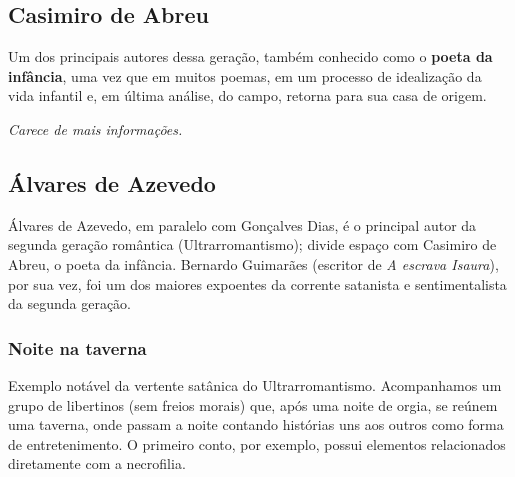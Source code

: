 \documentclass[12pt]{book}
\begin{document}
				\subsection{Casimiro de Abreu}
				\par Um dos principais autores dessa geração, também conhecido como o \textbf{poeta da infância}, uma vez que em muitos poemas, em um processo de idealização da vida infantil e, em última análise, do campo, retorna para sua casa de origem.
				\par \textit{Carece de mais informações.}
				\subsection{Álvares de Azevedo}
				\par Álvares de Azevedo, em paralelo com Gonçalves Dias, é o principal autor da segunda geração romântica (Ultrarromantismo); divide espaço com Casimiro de Abreu, o poeta da infância. Bernardo Guimarães (escritor de \textit{A escrava Isaura}), por sua vez, foi um dos maiores expoentes da corrente satanista e sentimentalista da segunda geração.
					\subsubsection{Noite na taverna}
					\par Exemplo notável da vertente satânica do Ultrarromantismo. Acompanhamos um grupo de libertinos (sem freios morais) que, após uma noite de orgia, se reúnem uma taverna, onde passam a noite contando histórias uns aos outros como forma de entretenimento. O primeiro conto, por exemplo, possui elementos relacionados diretamente com a necrofilia.
\end{document}
